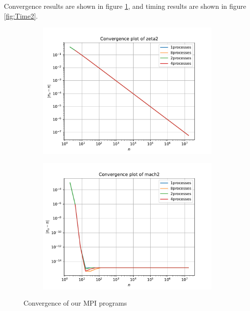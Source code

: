 \documentclass[12pt]{article}
\begin{document}
Convergence results are shown in figure \ref{fig:Convergence2},
and timing results are shown in figure \ref{fig:Time2}.
\begin{figure}
    \centering
    \begin{subfigure}[!htb]{0.45\textwidth}
        \includegraphics[width=\textwidth]{zeta2Convergence}
    \end{subfigure}
    \begin{subfigure}[!htb]{0.45\textwidth}
        \includegraphics[width=\textwidth]{mach2Convergence}
    \end{subfigure}
    \caption{Convergence of our MPI programs}\label{fig:Convergence2}
\end{figure}
\end{document}
